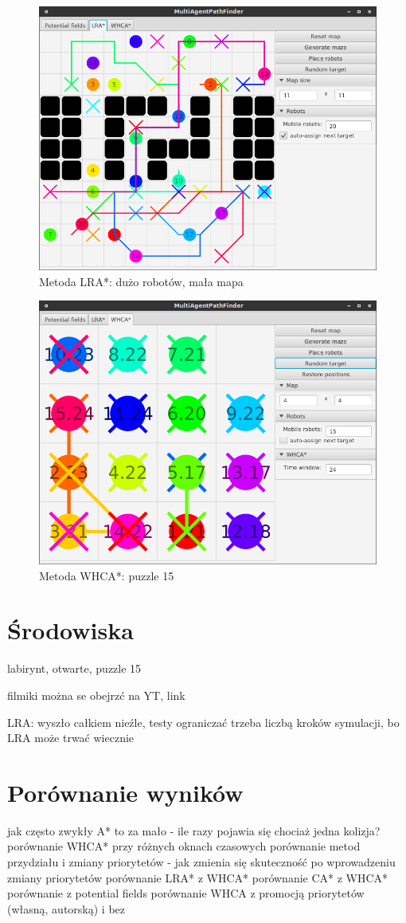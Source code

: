 \begin{figure}
	\centering
	\includegraphics[width=0.8\columnwidth]{img/robopath/lra-lot-robots}
	\caption{Metoda LRA*: dużo robotów, mała mapa}
	\label{fig:app-tech-intellij}
\end{figure}

\begin{figure}
	\centering
	\includegraphics[width=0.8\columnwidth]{img/robopath/puzzle-15}
	\caption{Metoda WHCA*: puzzle 15}
	\label{fig:app-tech-intellij}
\end{figure}

\section{Środowiska}
labirynt, otwarte, puzzle 15

filmiki można se obejrzć na YT, link

LRA: wyszło całkiem nieźle,
testy ograniczać trzeba liczbą kroków symulacji, bo LRA może trwać wiecznie

\section{Porównanie wyników}
jak często zwykły A* to za mało - ile razy pojawia się chociaż jedna kolizja?
porównanie WHCA* przy różnych oknach czasowych
porównanie metod przydziału i zmiany priorytetów - jak zmienia się skuteczność  po wprowadzeniu zmiany priorytetów
porównanie LRA* z WHCA*
porównanie CA* z WHCA*
porównanie z potential fields
porównanie WHCA z promocją priorytetów (własną, autorską) i bez
